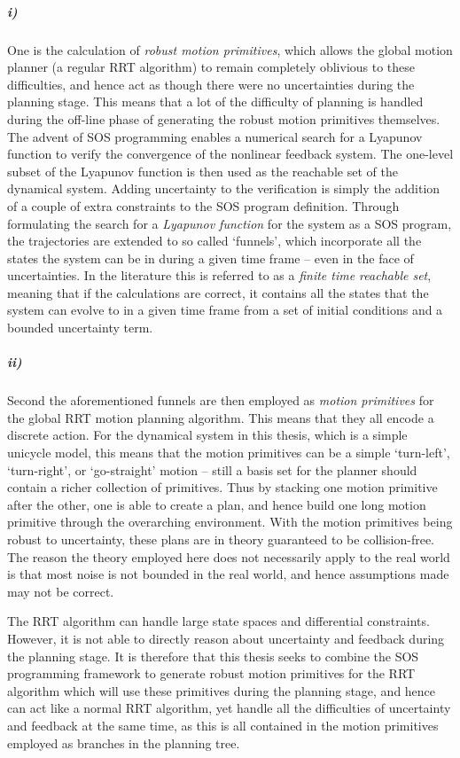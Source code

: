 \subparagraph{i)} One is the calculation of \textit{robust motion primitives},
which allows the global motion planner (a regular \ac{RRT} algorithm) to remain
completely oblivious to these difficulties, and hence act as though there were
no uncertainties during the planning stage. This means that a lot of the
difficulty of planning is handled during the off-line phase of generating the
robust motion primitives themselves. The advent of \ac{SOS} programming enables
a numerical search for a Lyapunov function to verify the convergence of the
nonlinear feedback system. The one-level subset of the Lyapunov function is then
used as the reachable set of the dynamical system. Adding uncertainty to the
verification is simply the addition of a couple of extra constraints to the
\ac{SOS} program definition. Through formulating the search for a
\textit{Lyapunov function} for the system as a \ac{SOS} program, the
trajectories are extended to so called `funnels', which incorporate all the
states the system can be in during a given time frame -- even in the face of
uncertainties. In the literature this is referred to as a \textit{finite time
  reachable set}, meaning that if the calculations are correct, it contains all
the states that the system can evolve to in a given time frame from a set of
initial conditions and a bounded uncertainty term.


\subparagraph{ii)} Second the aforementioned funnels are then employed as
\textit{motion primitives} for the global \ac{RRT} motion planning algorithm.
This means that they all encode a discrete action. For the dynamical system in
this thesis, which is a simple unicycle model, this means that the motion
primitives can be a simple `turn-left', `turn-right', or `go-straight' motion --
still a basis set for the planner should contain a richer collection of
primitives. Thus by stacking one motion primitive after the other, one is able
to create a plan, and hence build one long motion primitive through the
overarching environment. With the motion primitives being robust to uncertainty,
these plans are in theory guaranteed to be collision-free. The reason the theory
employed here does not necessarily apply to the real world is that most noise is
not bounded in the real world, and hence assumptions made may not be correct.


The \ac{RRT} algorithm can handle large state spaces and differential
constraints. However, it is not able to directly reason about uncertainty and
feedback during the planning stage. It is therefore that this thesis seeks to
combine the \ac{SOS} programming framework to generate robust motion primitives
for the \ac{RRT} algorithm which will use these primitives during the planning
stage, and hence can act like a normal \ac{RRT} algorithm, yet handle all the
difficulties of uncertainty and feedback at the same time, as this is all
contained in the motion primitives employed as branches in the planning tree.

